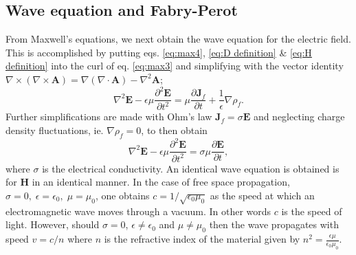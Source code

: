 \subsection{Wave equation and Fabry-Perot\label{sec:Wave equation}}
From Maxwell's equations, we next obtain the wave equation for the electric field. This is accomplished by putting eqs. \eqref{eq:max4}, \eqref{eq:D definition} \& \eqref{eq:H definition} into the curl of eq. \eqref{eq:max3} and simplifying with the vector identity $\nabla \times (\nabla \times \mathbf{A})=\nabla(\nabla \cdot \mathbf{A})-\nabla^2 \mathbf{A}$;
\begin{equation}
\nabla^2 \mathbf{E}-\epsilon \mu \frac{\partial^2 \mathbf{E}}{\partial t^2}=\mu \frac{\partial \mathbf{J}_f}{\partial t}+ \frac{1}{\epsilon}\nabla \rho_f.
\label{eq:pre wave eqn}
\end{equation}
Further simplifications are made with Ohm's law $\mathbf{J}_f=\sigma\mathbf{E} $ and neglecting charge density fluctuations, ie. $\nabla\rho_f=0$, to then obtain
\begin{equation}
\nabla^2 \mathbf{E}-\epsilon \mu \frac{\partial^2 \mathbf{E}}{\partial t^2}=\sigma \mu \frac{\partial \mathbf{E}}{\partial t},
\label{eq:wave eqn}
\end{equation}
where $\sigma$ is the electrical conductivity. An identical wave equation is obtained is for $\mathbf{H}$ in an identical manner. In the case of free space propagation, $\sigma=0, \; \epsilon=\epsilon_0, \; \mu=\mu_0$, one obtains $c=1/\sqrt{\epsilon_0\mu_0}$ as the speed at which an electromagnetic wave moves through a vacuum. In other words $c$ is the speed of light. However, should $\sigma=0$, $\epsilon \neq \epsilon_0$ and $\mu \neq \mu_0$ then the wave propagates with speed $v=c/n$ where $n$ is the refractive index of the material given by $n^2=\frac{\epsilon \mu}{\epsilon_0 \mu_0}$.


